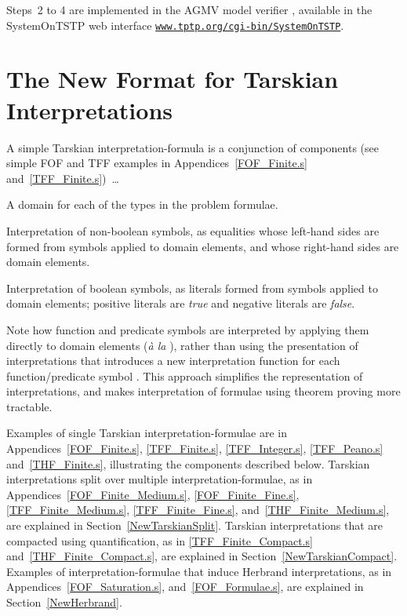 \documentclass{easychair}
\newenvironment{packed_itemize}{
\vspace*{-0.3em}
\begin{itemize}
\setlength{\partopsep}{0pt}
\setlength{\itemsep}{1pt}
\setlength{\parskip}{0pt}
\setlength{\parsep}{0pt}
}{\end{itemize}}
\begin{document}
Steps~2 to 4 are implemented in the AGMV model verifier \cite{SS+23-LPAR}, available in the
SystemOnTSTP \cite{Sut07-CSR} web interface
\href{https://www.tptp.org/cgi-bin/SystemOnTSTP}{{\tt www.tptp.org/cgi-bin/SystemOnTSTP}}.
      
\section{The New Format for Tarskian Interpretations}
\label{NewTarskian}

A simple Tarskian interpretation-formula is a conjunction of components (see simple FOF and TFF
examples in Appendices~\ref{FOF_Finite.s} and~\ref{TFF_Finite.s})~\ldots
\begin{packed_itemize}
\item A domain for each of the types in the problem formulae.
\item Interpretation of non-boolean symbols, as equalities whose left-hand sides are formed from 
      symbols applied to domain elements, and whose right-hand sides are domain elements.
\item Interpretation of boolean symbols, as literals formed from symbols applied to domain 
      elements; positive literals are \emph{true} and negative literals are \emph{false}.
\end{packed_itemize}

Note how function and predicate symbols are interpreted by applying them directly to domain
elements (\emph{{\`a} la} \cite[\S5.3.4]{Gal15}), rather than using the presentation of 
interpretations that introduces a new interpretation function for each function/predicate symbol 
\cite[\S5.3.2]{Gal15}.
This approach simplifies the representation of interpretations, and makes interpretation of 
formulae using theorem proving more tractable.

Examples of single Tarskian interpretation-formulae are in Appendices~\ref{FOF_Finite.s}, 
\ref{TFF_Finite.s}, \ref{TFF_Integer.s}, \ref{TFF_Peano.s} and~\ref{THF_Finite.s}, illustrating 
the components described below. 
Tarskian interpretations split over multiple interpretation-formulae, as in 
Appendices~\ref{FOF_Finite_Medium.s}, \ref{FOF_Finite_Fine.s}, \ref{TFF_Finite_Medium.s}, 
\ref{TFF_Finite_Fine.s}, and~\ref{THF_Finite_Medium.s}, are explained in 
Section~\ref{NewTarskianSplit}.
Tarskian interpretations that are compacted using quantification, as in \ref{TFF_Finite_Compact.s}
and~\ref{THF_Finite_Compact.s}, are explained in Section~\ref{NewTarskianCompact}.
Examples of interpretation-formulae that induce Herbrand interpretations, as in 
Appendices~\ref{FOF_Saturation.s}, and~\ref{FOF_Formulae.s}, are explained in 
Section~\ref{NewHerbrand}.
\end{document}
